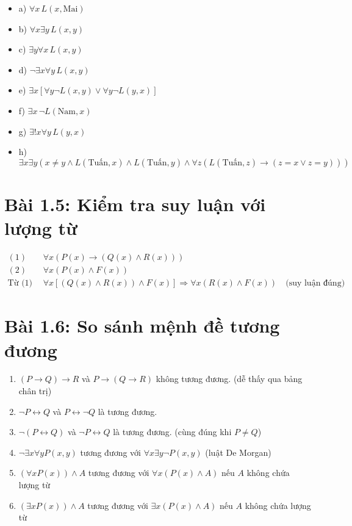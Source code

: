 \documentclass[12pt]{article}
\begin{document}
\begin{itemize}
    \item a) $\forall x \, L(x,\text{Mai})$
    \item b) $\forall x \exists y \, L(x,y)$
    \item c) $\exists y \forall x \, L(x,y)$
    \item d) $\neg \exists x \forall y \, L(x,y)$
    \item e) $\exists x \left[ \forall y \neg L(x,y) \lor \forall y \neg L(y,x) \right]$
    \item f) $\exists x \, \neg L(\text{Nam}, x)$
    \item g) $\exists! x \forall y \, L(y,x)$
    \item h) $\exists x \exists y (x \ne y \land L(\text{Tuấn}, x) \land L(\text{Tuấn}, y) \land \forall z (L(\text{Tuấn}, z) \rightarrow (z = x \lor z = y)))$
\end{itemize}

\section*{Bài 1.5: Kiểm tra suy luận với lượng từ}

\begin{align*}
(1)\quad & \forall x (P(x) \rightarrow (Q(x) \land R(x))) \\
(2)\quad & \forall x (P(x) \land F(x)) \\
\text{Từ (1) và (2):} & \forall x \left[ (Q(x) \land R(x)) \land F(x) \right] \Rightarrow \forall x (R(x) \land F(x)) \quad \text{(suy luận đúng)}
\end{align*}

\section*{Bài 1.6: So sánh mệnh đề tương đương}

\begin{enumerate}
    \item $(P \rightarrow Q) \rightarrow R$ và $P \rightarrow (Q \rightarrow R)$ không tương đương. (dễ thấy qua bảng chân trị)

    \item $\neg P \leftrightarrow Q$ và $P \leftrightarrow \neg Q$ là tương đương.

    \item $\neg(P \leftrightarrow Q)$ và $\neg P \leftrightarrow Q$ là tương đương. (cùng đúng khi $P \ne Q$)

    \item $\neg \exists x \forall y P(x,y)$ tương đương với $\forall x \exists y \neg P(x,y)$ (luật De Morgan)

    \item $(\forall x P(x)) \land A$ tương đương với $\forall x (P(x) \land A)$ nếu $A$ không chứa lượng từ

    \item $(\exists x P(x)) \land A$ tương đương với $\exists x (P(x) \land A)$ nếu $A$ không chứa lượng từ
\end{enumerate}
\end{document}
